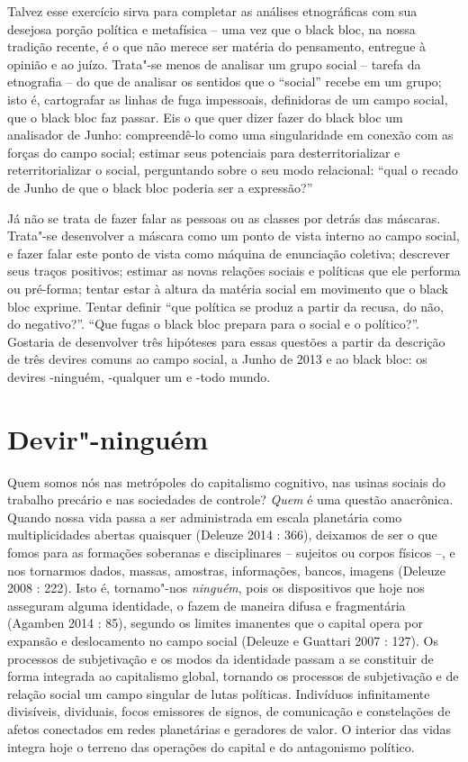 Talvez esse exercício sirva para completar as análises etnográficas com
sua desejosa porção política e metafísica -- uma vez que o black bloc,
na nossa tradição recente, é o que não merece ser matéria do pensamento,
entregue à opinião e ao juízo. Trata"-se menos de analisar um grupo
social -- tarefa da etnografia -- do que de analisar os sentidos que o
``social'' recebe em um grupo; isto é, cartografar as linhas de fuga
impessoais, definidoras de um campo social, que o black bloc faz passar.
Eis o que quer dizer fazer do black bloc um analisador de Junho:
compreendê-lo como uma singularidade em conexão com as forças do campo
social; estimar seus potenciais para desterritorializar e
reterritorializar o social, perguntando sobre o seu modo relacional:
``qual o recado de Junho de que o black bloc poderia ser a expressão?''

Já não se trata de fazer falar as pessoas ou as classes por detrás das
máscaras. Trata"-se desenvolver a máscara como um ponto de vista interno
ao campo social, e fazer falar este ponto de vista como máquina de
enunciação coletiva; descrever seus traços positivos; estimar as novas
relações sociais e políticas que ele performa ou pré-forma; tentar estar
à altura da matéria social em movimento que o black bloc exprime. Tentar
definir ``que política se produz a partir da recusa, do não, do
negativo?''. ``Que fugas o black bloc prepara para o social e o
político?''. Gostaria de desenvolver três hipóteses para essas questões
a partir da descrição de três devires comuns ao campo social, a Junho de
2013 e ao black bloc: os devires -ninguém, -qualquer um e -todo mundo.

\section{Devir"-ninguém}

Quem somos nós nas metrópoles do capitalismo
cognitivo, nas usinas sociais do trabalho precário e nas sociedades de
controle? \emph{Quem} é uma questão anacrônica. Quando nossa vida passa
a ser administrada em escala planetária como multiplicidades abertas
quaisquer (Deleuze 2014 : 366), deixamos de ser o que fomos para as
formações soberanas e disciplinares -- sujeitos ou corpos físicos --, e
nos tornarmos dados, massas, amostras, informações, bancos, imagens
(Deleuze 2008 : 222). Isto é, tornamo"-nos \emph{ninguém}, pois os
dispositivos que hoje nos asseguram alguma identidade, o fazem de
maneira difusa e fragmentária (Agamben 2014 : 85), segundo os limites
imanentes que o capital opera por expansão e deslocamento no campo
social (Deleuze e Guattari 2007 : 127). Os processos de subjetivação e
os modos da identidade passam a se constituir de forma integrada ao
capitalismo global, tornando os processos de subjetivação e de relação
social um campo singular de lutas políticas. Indivíduos infinitamente
divisíveis, dividuais, focos emissores de signos, de comunicação e
constelações de afetos conectados em redes planetárias e geradores de
valor. O interior das vidas integra hoje o terreno das operações do
capital e do antagonismo político.

